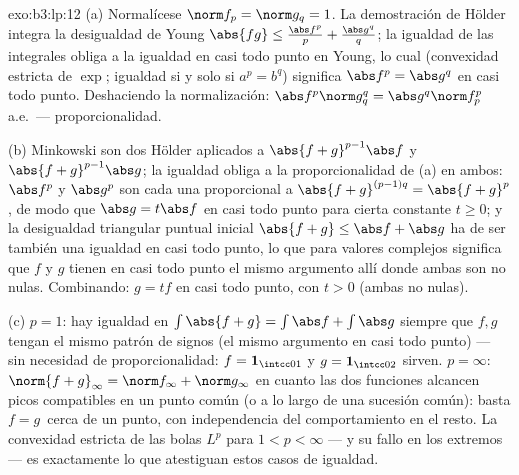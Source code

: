 \begin{solution}{exo:b3:lp:12}
(a) Normalícese $\norm f_p = \norm g_q = 1$. La demostración de Hölder
integra la desigualdad de Young $\abs{fg} \leq
\frac{\abs f^p}p + \frac{\abs g^q}q$; la igualdad de las integrales
obliga a la igualdad en casi todo punto en Young, lo cual (convexidad
estricta de $\exp$; igualdad si y solo si $a^p = b^q$) significa $\abs
f^p = \abs g^q$ en casi todo punto. Deshaciendo la normalización:
$\abs f^p\norm g_q^q = \abs g^q\norm f_p^p$ a.e.\ ---
proporcionalidad.

(b) Minkowski son dos Hölder aplicados a $\abs{f + g}^{p-1}
\abs f$ y $\abs{f+g}^{p-1}\abs g$; la igualdad obliga a la
proporcionalidad de (a) en ambos: $\abs f^p$ y $\abs g^p$ son cada una
proporcional a $\abs{f+g}^{(p-1)q} = \abs{f+g}^p$, de modo que
$\abs g = t\abs f$ en casi todo punto para cierta constante $t \geq 0$;
y la desigualdad triangular puntual inicial $\abs{f + g} \leq
\abs f + \abs g$ ha de ser también una igualdad en casi todo punto, lo
que para valores complejos significa que $f$ y $g$ tienen en casi todo
punto el mismo argumento allí donde ambas son no nulas. Combinando:
$g = tf$ en casi todo punto, con $t > 0$ (ambas no nulas).

(c) $p = 1$: hay igualdad en $\int\abs{f + g} = \int\abs f +
\int\abs g$ siempre que $f, g$ tengan el mismo patrón de signos (el
mismo argumento en casi todo punto) --- sin necesidad de
proporcionalidad: $f = \mathbf 1_{\intcc01}$ y
$g = \mathbf 1_{\intcc02}$ sirven. $p = \infty$:
$\norm{f+g}_\infty = \norm f_\infty +
\norm g_\infty$ en cuanto las dos funciones alcancen picos compatibles
en un punto común (o a lo largo de una sucesión común): basta $f = g\,$
cerca de un punto, con independencia del comportamiento en el resto. La
convexidad estricta de las bolas $L^p$ para $1 <
p < \infty$ --- y su fallo en los extremos --- es exactamente lo que
atestiguan estos casos de igualdad.
\end{solution}

